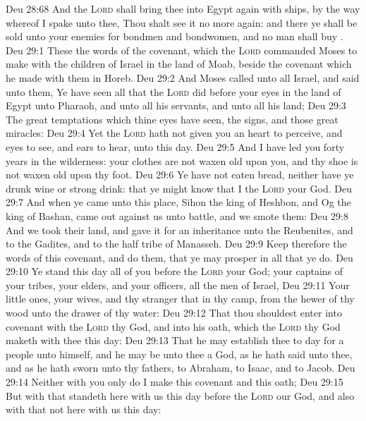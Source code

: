 \vs Deu 28:68 And the \textsc{Lord} shall bring thee into Egypt again with ships, by the way whereof I spake unto thee, Thou shalt see it no more again: and there ye shall be sold unto your enemies for bondmen and bondwomen, and no man shall buy .
\vs Deu 29:1 These  the words of the covenant, which the \textsc{Lord} commanded Moses to make with the children of Israel in the land of Moab, beside the covenant which he made with them in Horeb.
\vs Deu 29:2 And Moses called unto all Israel, and said unto them, Ye have seen all that the \textsc{Lord} did before your eyes in the land of Egypt unto Pharaoh, and unto all his servants, and unto all his land;
\vs Deu 29:3 The great temptations which thine eyes have seen, the signs, and those great miracles:
\vs Deu 29:4 Yet the \textsc{Lord} hath not given you an heart to perceive, and eyes to see, and ears to hear, unto this day.
\vs Deu 29:5 And I have led you forty years in the wilderness: your clothes are not waxen old upon you, and thy shoe is not waxen old upon thy foot.
\vs Deu 29:6 Ye have not eaten bread, neither have ye drunk wine or strong drink: that ye might know that I  the \textsc{Lord} your God.
\vs Deu 29:7 And when ye came unto this place, Sihon the king of Heshbon, and Og the king of Bashan, came out against us unto battle, and we smote them:
\vs Deu 29:8 And we took their land, and gave it for an inheritance unto the Reubenites, and to the Gadites, and to the half tribe of Manasseh.
\vs Deu 29:9 Keep therefore the words of this covenant, and do them, that ye may prosper in all that ye do.
\vs Deu 29:10 Ye stand this day all of you before the \textsc{Lord} your God; your captains of your tribes, your elders, and your officers,  all the men of Israel,
\vs Deu 29:11 Your little ones, your wives, and thy stranger that  in thy camp, from the hewer of thy wood unto the drawer of thy water:
\vs Deu 29:12 That thou shouldest enter into covenant with the \textsc{Lord} thy God, and into his oath, which the \textsc{Lord} thy God maketh with thee this day:
\vs Deu 29:13 That he may establish thee to day for a people unto himself, and  he may be unto thee a God, as he hath said unto thee, and as he hath sworn unto thy fathers, to Abraham, to Isaac, and to Jacob.
\vs Deu 29:14 Neither with you only do I make this covenant and this oath;
\vs Deu 29:15 But with  that standeth here with us this day before the \textsc{Lord} our God, and also with  that  not here with us this day:
